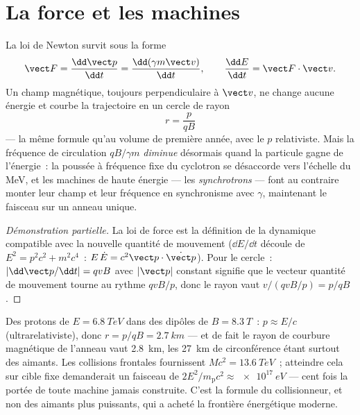\section{La force et les machines}

\begin{proposition}\label{prop:b3:relativistic-dynamics:force}
La loi de Newton survit sous la forme
\[
\vect F = \frac{\dd\vect p}{\dd t} = \frac{\dd(\gamma m\vect v)}
{\dd t} , \qquad
\frac{\dd E}{\dd t} = \vect F\cdot\vect v .
\]
Un champ magnétique, toujours perpendiculaire à $\vect v$, ne change
aucune énergie et courbe la trajectoire en un cercle de rayon
\[
r = \frac{p}{qB}
\]
--- la même formule qu'au volume de première année, avec le $p$
relativiste. Mais la fréquence de circulation $qB/\gamma m$
\emph{diminue} désormais quand la particule gagne de l'énergie~: la
poussée à fréquence fixe du cyclotron se désaccorde vers l'échelle du
MeV, et les machines de haute énergie --- les \emph{synchrotrons} ---
font au contraire monter leur champ et leur fréquence en synchronisme
avec $\gamma$, maintenant le faisceau sur un anneau unique.
\end{proposition}

\begin{proof}[Démonstration partielle]
La loi de force est la définition de la dynamique compatible avec la
nouvelle quantité de mouvement ($\dd E/\dd t$ découle de
$E^2 = p^2c^2 + m^2c^4$~: $E\,\dot E = c^2\vect p\cdot\dot{\vect p}$).
Pour le cercle~: $|\dd\vect p/\dd t| = qvB$ avec $|\vect p|$ constant
signifie que le vecteur quantité de mouvement tourne au rythme
$qvB/p$, donc le rayon vaut $v/(qvB/p) = p/qB$.
\end{proof}

\begin{example}\label{ex:b3:relativistic-dynamics:lhc}
Des protons de $E = \qty{6.8}{TeV}$ dans des dipôles de $B = \qty{8.3}{T}$~:
$p \approx E/c$ (ultrarelativiste), donc $r = p/qB =
\qty{2.7}{km}$ --- et de fait le rayon de courbure magnétique de
l'anneau vaut \qty{2.8}{km}, les \qty{27}{km} de circonférence étant
surtout des aimants. Les collisions frontales fournissent
$Mc^2 = \qty{13.6}{TeV}$~; atteindre cela sur cible fixe demanderait un
faisceau de $2E^2/m_{\text{p}}c^2 \approx
\qty{e17}{eV}$ --- cent fois la portée de toute machine jamais
construite. C'est la formule du collisionneur, et non des aimants plus
puissants, qui a acheté la frontière énergétique moderne.
\end{example}

